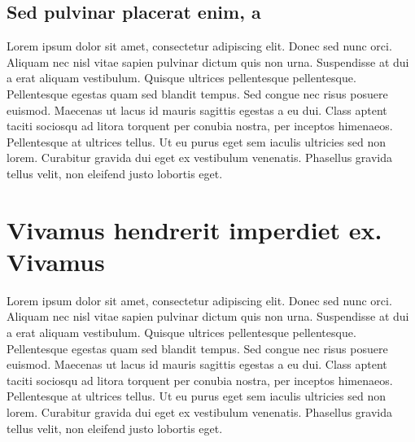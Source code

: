 \subsection{Sed pulvinar placerat enim, a}
\label{sec:00456}
Lorem ipsum dolor sit amet, consectetur adipiscing elit. Donec sed nunc orci. Aliquam nec nisl vitae sapien pulvinar dictum quis non urna. Suspendisse at dui a erat aliquam vestibulum. Quisque ultrices pellentesque pellentesque. Pellentesque egestas quam sed blandit tempus. Sed congue nec risus posuere euismod. Maecenas ut lacus id mauris sagittis egestas a eu dui. Class aptent taciti sociosqu ad litora torquent per conubia nostra, per inceptos himenaeos. Pellentesque at ultrices tellus. Ut eu purus eget sem iaculis ultricies sed non lorem. Curabitur gravida dui eget ex vestibulum venenatis. Phasellus gravida tellus velit, non eleifend justo lobortis eget.


\section{Vivamus hendrerit imperdiet ex. Vivamus}
\label{sec:123}
Lorem ipsum dolor sit amet, consectetur adipiscing elit. Donec sed nunc orci. Aliquam nec nisl vitae sapien pulvinar dictum quis non urna. Suspendisse at dui a erat aliquam vestibulum. Quisque ultrices pellentesque pellentesque. Pellentesque egestas quam sed blandit tempus. Sed congue nec risus posuere euismod. Maecenas ut lacus id mauris sagittis egestas a eu dui. Class aptent taciti sociosqu ad litora torquent per conubia nostra, per inceptos himenaeos. Pellentesque at ultrices tellus. Ut eu purus eget sem iaculis ultricies sed non lorem. Curabitur gravida dui eget ex vestibulum venenatis. Phasellus gravida tellus velit, non eleifend justo lobortis eget.


